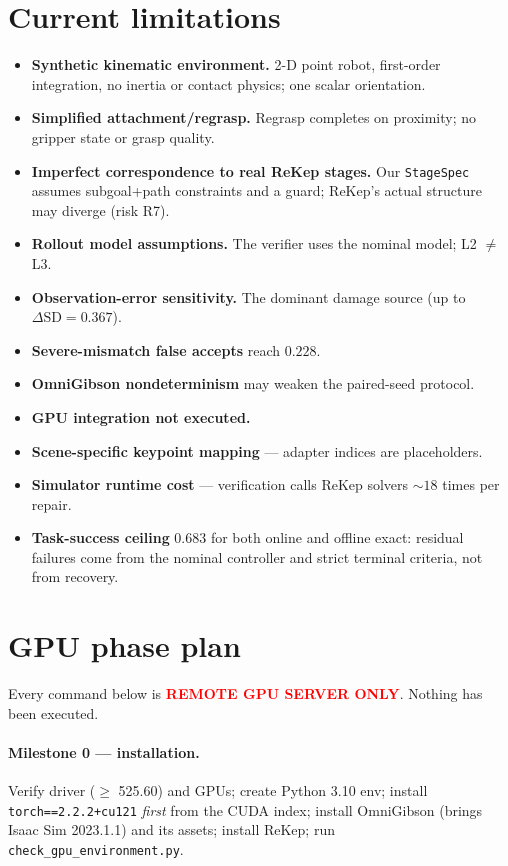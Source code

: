 \documentclass[11pt]{article}
\newcommand{\SD}{\mathrm{SD}}
\newcommand{\REMOTE}{\textcolor{red}{\textbf{REMOTE GPU SERVER ONLY}}}
\begin{document}
\section{Current limitations}

\begin{itemize}[leftmargin=2em,itemsep=1pt]
\item \textbf{Synthetic kinematic environment.} 2-D point robot, first-order
      integration, no inertia or contact physics; one scalar orientation.
\item \textbf{Simplified attachment/regrasp.} Regrasp completes on proximity;
      no gripper state or grasp quality.
\item \textbf{Imperfect correspondence to real ReKep stages.} Our
      \texttt{StageSpec} assumes subgoal+path constraints and a guard; ReKep's
      actual structure may diverge (risk R7).
\item \textbf{Rollout model assumptions.} The verifier uses the nominal model;
      L2 $\neq$ L3.
\item \textbf{Observation-error sensitivity.} The dominant damage source
      (up to $\Delta\SD=0.367$).
\item \textbf{Severe-mismatch false accepts} reach $0.228$.
\item \textbf{OmniGibson nondeterminism} may weaken the paired-seed protocol.
\item \textbf{GPU integration not executed.}
\item \textbf{Scene-specific keypoint mapping} --- adapter indices are
      placeholders.
\item \textbf{Simulator runtime cost} --- verification calls ReKep solvers
      $\sim\!18$ times per repair.
\item \textbf{Task-success ceiling} $0.683$ for both online and offline exact:
      residual failures come from the nominal controller and strict terminal
      criteria, not from recovery.
\end{itemize}

\section{GPU phase plan}
\label{sec:gpu}

Every command below is \REMOTE{}. Nothing has been executed.

\paragraph{Milestone 0 --- installation.} Verify driver ($\ge$ 525.60) and GPUs;
create Python 3.10 env; install \texttt{torch==2.2.2+cu121} \emph{first} from the
CUDA index; install OmniGibson (brings Isaac Sim 2023.1.1) and its assets;
install ReKep; run \texttt{check\_gpu\_environment.py}.
\end{document}
